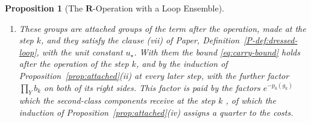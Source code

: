 \documentclass[11pt]{preprint}
\numberwithin{equation}{section}
\newtheorem{proposition}{Proposition}
\theoremstyle{definition}
\theoremstyle{remark}
\theoremstyle{plain}
\begin{document}
\begin{proposition}[The $\mathbf R$-Operation with a Loop Ensemble]
\begin{enumerate}[label=(\roman*)]
\begin{enumerate}[label=(\alph*)]
\begin{equation}
\end{equation}
the sum over the finite sets of pairwise compatible groups which are bound to second-class components and the product over the second-class components of the term, with a constant $C_x$ which depends on the constants of the construction, on $\Lambda_*$, and on $c_{\mathcal C}$. Moreover $\log b_k \leq \frac{1}{16}p_0(g_k)$.
\item These groups are attached groups of the term after the operation, made at the step $k$, and they satisfy the clause (vii) of Paper, Definition~\ref{P-def:dressed-loop}, with the unit constant $u_\star$. With them the bound \eqref{eq:carry-bound} holds after the operation of the step $k$, and by the induction of Proposition~\ref{prop:attached}(ii) at every later step, with the further factor $\prod_Yb_k$ on both of its right sides. This factor is paid by the factors $e^{-p_0(g_k)}$ which the second-class components receive at the step $k$ \cite[pp.~385--386]{BalabanLFR2}, of which the induction of Proposition~\ref{prop:attached}(iv) assigns a quarter to the costs.
\end{enumerate}
\end{enumerate}
\end{proposition}
\end{document}
